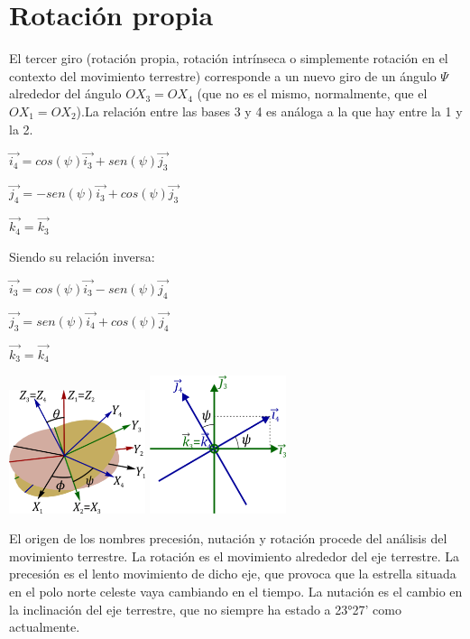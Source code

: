 \documentclass[12pt,a4paper]{report}
\begin{document}
\section{Rotación propia}
El tercer giro (rotación propia, rotación intrínseca o simplemente rotación en el contexto del movimiento terrestre) corresponde a un nuevo giro de un ángulo $\Psi$ alrededor del ángulo $OX_{3}=OX_{4}$ (que no es el mismo, normalmente, que el $OX_{1}=OX_{2}$).La relación entre las bases 3 y 4 es análoga a la que hay entre la 1 y la 2.
\begin{center}
$\overrightarrow{i_{4}}=cos(\psi)\overrightarrow{i_{3}}+sen(\psi)\overrightarrow{j_{3}}$

$\overrightarrow{j_{4}}=-sen(\psi)\overrightarrow{i_{3}}+cos(\psi)\overrightarrow{j_{3}}$

$\overrightarrow{k_{4}}=\overrightarrow{k_{3}}$
\end{center}
Siendo su relación inversa:
\begin{center}
$\overrightarrow{i_{3}}=cos(\psi)\overrightarrow{i_{3}}-sen(\psi)\overrightarrow{j_{4}}$

$\overrightarrow{j_{3}}=sen(\psi)\overrightarrow{i_{4}}+cos(\psi)\overrightarrow{j_{4}}$

$\overrightarrow{k_{3}}=\overrightarrow{k_{4}}$
\end{center}
\begin{center}
\includegraphics[width=4cm]{6.png}
\includegraphics[width=4cm]{7.png} 
\end{center} 
El origen de los nombres precesión, nutación y rotación procede del análisis del movimiento terrestre. La rotación es el movimiento alrededor del eje terrestre. La precesión es el lento movimiento de dicho eje, que provoca que la estrella situada en el polo norte celeste vaya cambiando en el tiempo. La nutación es el cambio en la inclinación del eje terrestre, que no siempre ha estado a 23°27' como actualmente.
\end{document}
